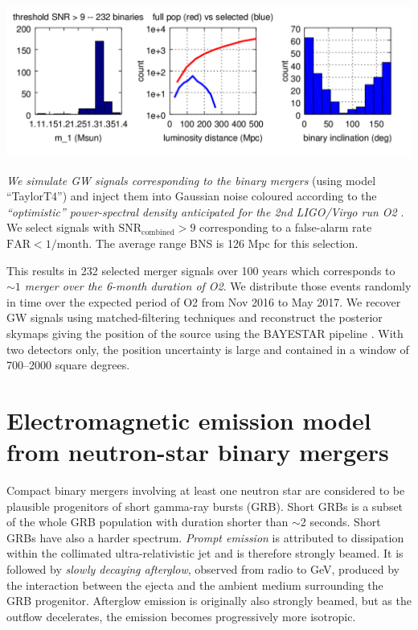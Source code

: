 \documentclass[12pt, a4]{article}
\begin{document}
\begin{center}
    \includegraphics[scale=.8]{summary_plot.png}
\end{center}
\vspace*{-0.8cm}

\emph{We simulate GW signals corresponding to the binary mergers} (using model
``TaylorT4'') and inject them into Gaussian noise coloured according to the
\emph{``optimistic'' power-spectral density anticipated for the 2nd LIGO/Virgo run O2}
\cite{lrr-2016-1}. We select signals with $\mathrm{SNR}_{\mathrm{combined}} > 9$
corresponding to a false-alarm rate $\mathrm{FAR} < 1/\mathrm{month}$. The
average range BNS is 126 Mpc for this selection.

This results in 232 selected merger signals over 100 years which corresponds to
\emph{$\sim 1$ merger over the 6-month duration of O2}. We distribute those events
randomly in time over the expected period of O2 from Nov 2016 to May 2017. We
recover GW signals using matched-filtering techniques and reconstruct the
posterior skymaps giving the position of the source using the BAYESTAR pipeline
\cite{PhysRevD.93.024013}.  With two detectors only, the position uncertainty is
large and contained in a window of 700--2000 square degrees.

\section*{Electromagnetic emission model from neutron-star binary mergers}

Compact binary mergers involving at least one neutron star are considered to be
plausible progenitors of short gamma-ray bursts (GRB). Short GRBs is a
subset of the whole GRB population with duration shorter than $\sim$2
seconds. Short GRBs have also a harder spectrum. \emph{Prompt emission} is attributed
to dissipation within the collimated ultra-relativistic jet and is therefore
strongly beamed. It is followed by \emph{slowly decaying afterglow}, observed from
radio to GeV, produced by the interaction between the ejecta and the ambient
medium surrounding the GRB progenitor. Afterglow emission is originally also
strongly beamed, but as the outflow decelerates, the emission becomes
progressively more isotropic.
\end{document}
